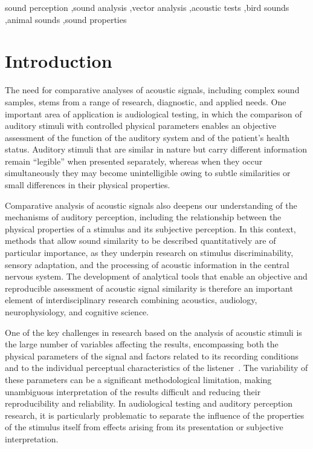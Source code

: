 \documentclass[preprint,12pt]{elsarticle}
\begin{document}
\begin{frontmatter}
\begin{abstract}
\end{abstract}

\begin{keyword}
sound perception \sep sound analysis \sep vector analysis \sep acoustic tests \sep bird sounds \sep animal sounds \sep sound properties
\end{keyword}

\end{frontmatter}

\linenumbers

\section{Introduction}

The need for comparative analyses of acoustic signals, including complex sound samples, stems from a range of research, diagnostic, and applied needs. One important area of application is audiological testing, in which the comparison of auditory stimuli with controlled physical parameters enables an objective assessment of the function of the auditory system and of the patient's health status.
Auditory stimuli that are similar in nature but carry different information remain ``legible'' when presented separately, whereas when they occur simultaneously they may become unintelligible owing to subtle similarities or small differences in their physical properties.

Comparative analysis of acoustic signals also deepens our understanding of the mechanisms of auditory perception, including the relationship between the physical properties of a stimulus and its subjective perception. In this context, methods that allow sound similarity to be described quantitatively are of particular importance, as they underpin research on stimulus discriminability, sensory adaptation, and the processing of acoustic information in the central nervous system.
The development of analytical tools that enable an objective and reproducible assessment of acoustic signal similarity is therefore an important element of interdisciplinary research combining acoustics, audiology, neurophysiology, and cognitive science.

One of the key challenges in research based on the analysis of acoustic stimuli is the large number of variables affecting the results, encompassing both the physical parameters of the signal and factors related to its recording conditions and to the individual perceptual characteristics of the listener~\cite{Letowski1989SoundQuality}. The variability of these parameters can be a significant methodological limitation, making unambiguous interpretation of the results difficult and reducing their reproducibility and reliability. In audiological testing and auditory perception research, it is particularly problematic to separate the influence of the properties of the stimulus itself from effects arising from its presentation or subjective interpretation.
\end{document}
